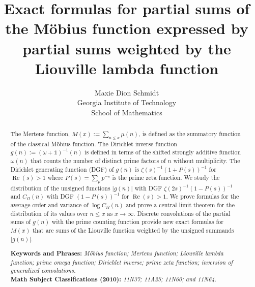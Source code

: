 \documentclass[11pt,reqno,a4letter]{article}
\title{
       Exact formulas for partial sums of the M\"obius function expressed by 
       partial sums weighted by the Liouville lambda function
}
\author{Maxie Dion Schmidt \\
        Georgia Institute of Technology \\
        School of Mathematics
}
\date{}
\numberwithin{equation}{section}
\numberwithin{figure}{section}
\numberwithin{table}{section}
\theoremstyle{plain}
\numberwithin{theorem}{section}
\theoremstyle{definition}
\theoremstyle{remark}
\renewcommand{\Re}{\operatorname{Re}}
\begin{document}
 

\maketitle

\begin{abstract} 
\noindent  
The Mertens function, $M(x) := \sum_{n \leq x} \mu(n)$, is 
defined as the summatory function of the classical M\"obius function.
The Dirichlet inverse function $g(n) := (\omega+\mathds{1})^{-1}(n)$
is defined in terms of the shifted strongly additive function $\omega(n)$ that counts the 
number of distinct prime factors of $n$ without multiplicity. 
The Dirichlet generating function (DGF) of $g(n)$ is $\zeta(s)^{-1} (1+P(s))^{-1}$ 
for $\Re(s) > 1$ where $P(s) = \sum_p p^{-s}$ is the prime zeta function. 
We study the distribution of the unsigned functions $|g(n)|$ with 
DGF $\zeta(2s)^{-1}(1-P(s))^{-1}$ 
and $C_{\Omega}(n)$ with DGF 
$(1-P(s))^{-1}$ for $\Re(s) > 1$. 
We prove formulas for the average order and variance of 
$\log C_{\Omega}(n)$ and prove a central limit theorem 
for the distribution of its values over $n \leq x$ as $x \rightarrow \infty$. 
Discrete convolutions of the partial sums of $g(n)$ with the prime counting function 
provide new exact formulas for $M(x)$ that are sums of the Liouville function 
weighted by the unsigned summands $|g(n)|$. 

\bigskip\noindent
\textbf{Keywords and Phrases:} {\it M\"obius function; Mertens function; 
                                    Liouville lambda function; prime omega function; 
                                    Dirichlet inverse; prime zeta function; 
				                inversion of generalized convolutions. } \\[0.05cm] 
\textbf{Math Subject Classifications (2010):} {\it 11N37; 11A25; 11N60; and 11N64. } 
\end{abstract} 
\end{document}
